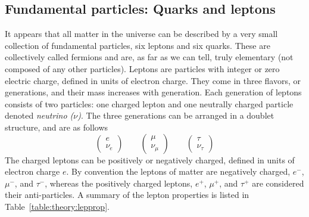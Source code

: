 \subsection{Fundamental particles: Quarks and leptons}
It appears that all matter in the universe can be described by a very small collection of fundamental particles, six leptons and six quarks. These are collectively called fermions and are, as far as we can tell, truly elementary (not composed of any other particles).
Leptons are particles with integer or zero electric charge, defined in units of electron charge. They come in three flavors, or generations, and their mass increases with generation. Each generation of leptons consists of two particles: one charged lepton and one neutrally charged particle denoted \emph{neutrino ($\nu$)}. The three generations can be arranged in a doublet structure, and are as follows
\begin{equation}
\label{eqn:lepton_flavor_doublets}
\begin{pmatrix} e       \\ \nu_e      \end{pmatrix} \qquad
\begin{pmatrix} \mu     \\ \nu_{\mu}  \end{pmatrix} \qquad
\begin{pmatrix} \tau    \\ \nu_{\tau} \end{pmatrix}
\end{equation}
The charged leptons can be positively or negatively charged, defined in units of electron charge $e$. By convention the leptons of matter are negatively charged, $e^{-}$, $\mu^{-}$, and $\tau^{-}$,  whereas the positively charged leptons,  $e^{+}$, $\mu^{+}$, and $\tau^{+}$ are considered their anti-particles.
A summary of the lepton properties is listed in Table~\ref{table:theory:lepprop}.
